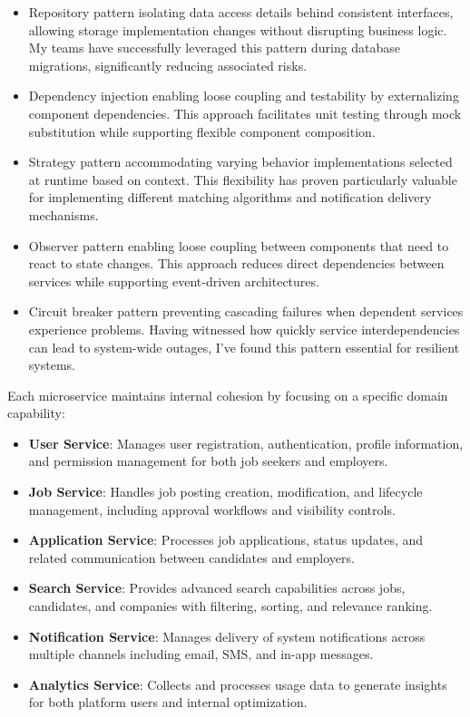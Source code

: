 \documentclass[12pt,a4paper]{article}
\begin{document}
\begin{itemize}
    \item Repository pattern isolating data access details behind consistent interfaces, allowing storage implementation changes without disrupting business logic. My teams have successfully leveraged this pattern during database migrations, significantly reducing associated risks.
    \item Dependency injection enabling loose coupling and testability by externalizing component dependencies. This approach facilitates unit testing through mock substitution while supporting flexible component composition.
    \item Strategy pattern accommodating varying behavior implementations selected at runtime based on context. This flexibility has proven particularly valuable for implementing different matching algorithms and notification delivery mechanisms.
    \item Observer pattern enabling loose coupling between components that need to react to state changes. This approach reduces direct dependencies between services while supporting event-driven architectures.
    \item Circuit breaker pattern preventing cascading failures when dependent services experience problems. Having witnessed how quickly service interdependencies can lead to system-wide outages, I've found this pattern essential for resilient systems.
\end{itemize}

Each microservice maintains internal cohesion by focusing on a specific domain capability:

\begin{itemize}
    \item \textbf{User Service}: Manages user registration, authentication, profile information, and permission management for both job seekers and employers.
    \item \textbf{Job Service}: Handles job posting creation, modification, and lifecycle management, including approval workflows and visibility controls.
    \item \textbf{Application Service}: Processes job applications, status updates, and related communication between candidates and employers.
    \item \textbf{Search Service}: Provides advanced search capabilities across jobs, candidates, and companies with filtering, sorting, and relevance ranking.
    \item \textbf{Notification Service}: Manages delivery of system notifications across multiple channels including email, SMS, and in-app messages.
    \item \textbf{Analytics Service}: Collects and processes usage data to generate insights for both platform users and internal optimization.
\end{itemize}
\end{document}
